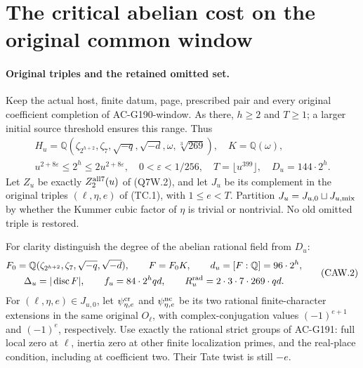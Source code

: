 \section{The critical abelian cost on the original common window}
\label{sec:critical-abelian-actual-window}

\paragraph{Original triples and the retained omitted set.}
Keep the actual host, finite datum, page, prescribed pair and every
original coefficient completion of AC-G190-window.  As there,
$h\geq2$ and $T\geq1$; a larger initial source threshold
ensures this range.  Thus
\[
 \begin{gathered}
 H_u=\mathbb Q(\zeta_{2^{h+2}},\zeta_7,
       \sqrt{-q},\sqrt{-d},\omega,\sqrt[3]{269}),
       \quad K=\mathbb Q(\omega),\\
 u^{2+8\varepsilon}\leq2^h\leq2u^{2+8\varepsilon},
 \quad0<\varepsilon<1/256,\quad T=\lfloor u^{399}\rfloor,
 \quad D_u=144\cdot2^h.
 \end{gathered}\tag{CAW.1}
\]
Let $Z_u$ be exactly $Z^{\rm all7}_2(u)$ of (Q7W.2), and let
$J_u$ be its complement in the original triples
$(\ell,\eta,e)$ of (TC.1), with $1\leq e<T$.
Partition $J_u=J_{u,0}\sqcup J_{u,\rm mix}$ by whether the
Kummer cubic factor of $\eta$ is trivial or nontrivial.
No old omitted triple is restored.

For clarity distinguish the degree of the abelian rational field
from $D_u$:
\[
 \begin{gathered}
 F_0=\mathbb Q(\zeta_{2^{h+2}},\zeta_7,\sqrt{-q},\sqrt{-d}),
       \qquad F=F_0K,\qquad d_u=[F:\mathbb Q]=96\cdot2^h,\\
 \Delta_u=|\operatorname{disc}F|,
 \qquad f_u=84\cdot2^hqd,
 \qquad R_u^{\rm rad}=2\cdot3\cdot7\cdot269\cdot qd.
 \end{gathered}\tag{CAW.2}
\]
For $(\ell,\eta,e)\in J_{u,0}$, let
$\psi_{\eta,e}^{\rm cr}$ and $\psi_{\eta,e}^{\rm nc}$ be its
two rational finite-character extensions in the same original
$O_\ell$, with complex-conjugation values
$(-1)^{e+1}$ and $(-1)^e$, respectively.
Use exactly the rational strict groups of AC-G191: full local
zero at $\ell$, inertia zero at other finite localization primes,
and the real-place condition, including at coefficient two.
Their Tate twist is still $-e$.

